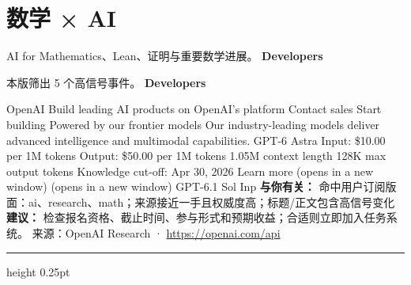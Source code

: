 \documentclass[10.5pt]{ctexart}
\begin{document}
\section*{数学 × AI}
{\color{ormuted} AI for Mathematics、Lean、证明与重要数学进展。}
\vspace{2mm}
{\LARGE\bfseries Developers}\par
\vspace{1mm}
{\color{ormuted} 本版筛出 5 个高信号事件。}
\vspace{3mm}
{\Large\bfseries Developers}\par
OpenAI Build leading AI products on OpenAI’s platform Contact sales Start building Powered by our frontier models Our industry-leading models deliver advanced intelligence and multimodal capabilities. GPT-6 Astra Input: \$10.00 per 1M tokens Output: \$50.00 per 1M tokens 1.05M context length 128K max output tokens Knowledge cut-off: Apr 30, 2026 Learn more (opens in a new window) (opens in a new window) GPT-6.1 Sol Inp
\textbf{与你有关：} 命中用户订阅版面：ai、research、math；来源接近一手且权威度高；标题/正文包含高信号变化
\textbf{建议：} 检查报名资格、截止时间、参与形式和预期收益；合适则立即加入任务系统。
{\footnotesize\color{ormuted} 来源：OpenAI Research · \url{https://openai.com/api}}
\vspace{4mm}
\hrule height 0.25pt
\vspace{3mm}
\end{document}
